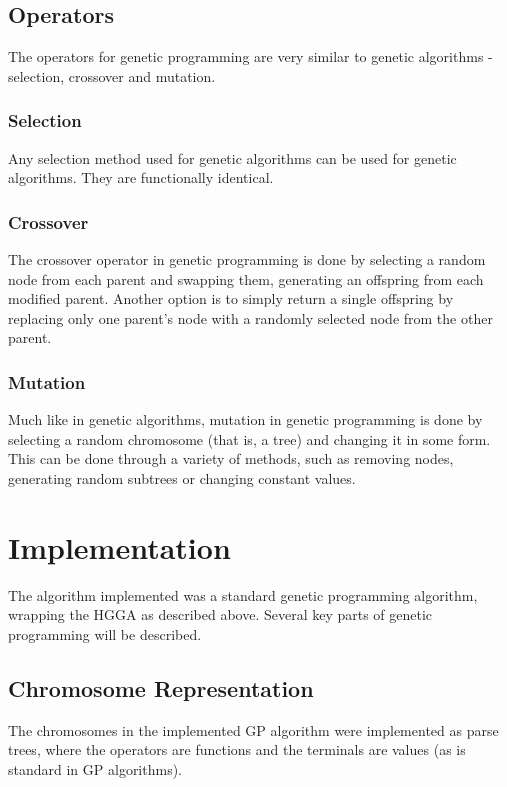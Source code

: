 \documentclass[conference]{IEEEtran}
\begin{document}
\subsection{Operators}
The operators for genetic programming are very similar to genetic algorithms - selection, crossover and mutation.\\

\subsubsection{Selection}
Any selection method used for genetic algorithms can be used for genetic algorithms. They are functionally identical.\\

\subsubsection{Crossover}
The crossover operator in genetic programming is done by selecting a random node from each parent and swapping them, generating an offspring from each modified parent. Another option is to simply return a single offspring by replacing only one parent's node with a randomly selected node from the other parent.\\

\subsubsection{Mutation}
Much like in genetic algorithms, mutation in genetic programming is done by selecting a random chromosome (that is, a tree) and changing it in some form. This can be done through a variety of methods, such as removing nodes, generating random subtrees or changing constant values.

\section{Implementation}
\label{implementation}
The algorithm implemented was a standard genetic programming algorithm, wrapping the HGGA as described above. Several key parts of genetic programming will be described.

\subsection{Chromosome Representation}
The chromosomes in the implemented GP algorithm were implemented as parse trees, where the operators are functions and the terminals are values (as is standard in GP algorithms).\\
\end{document}
